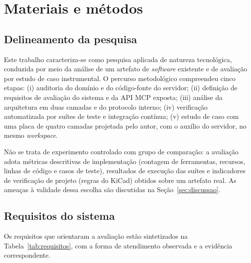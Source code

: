 \section{Materiais e métodos}\label{sec:metodologia}

\subsection{Delineamento da pesquisa}

Este trabalho caracteriza-se como pesquisa aplicada de natureza tecnológica,
conduzida por meio da análise de um artefato de \emph{software} existente e de
avaliação por estudo de caso instrumental. O percurso metodológico compreendeu
cinco etapas:
(i) auditoria do domínio e do código-fonte do servidor;
(ii) definição de requisitos de avaliação do sistema e da API MCP exposta;
(iii) análise da arquitetura em duas camadas e do protocolo interno;
(iv) verificação automatizada por suítes de teste e integração contínua;
(v) estudo de caso com uma placa de quatro camadas projetada pelo autor, com o
auxílio do servidor, no mesmo \emph{workspace}.

Não se trata de experimento controlado com grupo de comparação: a avaliação
adota métricas descritivas de implementação (contagem de ferramentas, recursos,
linhas de código e casos de teste), resultados de execução das suítes e
indicadores de verificação de projeto (regras do KiCad) obtidos sobre um
artefato real. As ameaças à validade dessa escolha são discutidas na
Seção~\ref{sec:discussao}.

\subsection{Requisitos do sistema}

Os requisitos que orientaram a avaliação estão sintetizados na
Tabela~\ref{tab:requisitos}, com a forma de atendimento observada e a
evidência correspondente.

